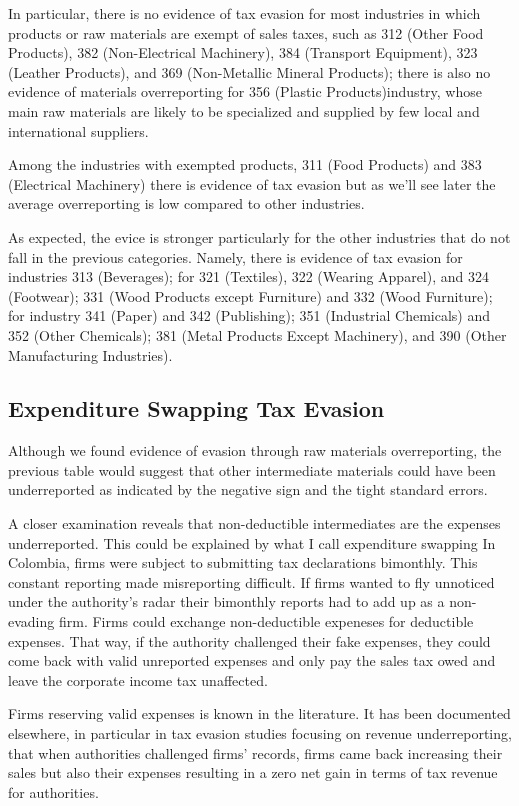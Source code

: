 \documentclass[
  12pt]{article}
\theoremstyle{definition}
\theoremstyle{remark}
\begin{document}
In particular, there is no evidence of tax evasion for most industries
in which products or raw materials are exempt of sales taxes, such as
312 (Other Food Products), 382 (Non-Electrical Machinery), 384
(Transport Equipment), 323 (Leather Products), and 369 (Non-Metallic
Mineral Products); there is also no evidence of materials overreporting
for 356 (Plastic Products)industry, whose main raw materials are likely
to be specialized and supplied by few local and international suppliers.

Among the industries with exempted products, 311 (Food Products) and 383
(Electrical Machinery) there is evidence of tax evasion but as we'll see
later the average overreporting is low compared to other industries.

As expected, the evice is stronger particularly for the other industries
that do not fall in the previous categories. Namely, there is evidence
of tax evasion for industries 313 (Beverages); for 321 (Textiles), 322
(Wearing Apparel), and 324 (Footwear); 331 (Wood Products except
Furniture) and 332 (Wood Furniture); for industry 341 (Paper) and 342
(Publishing); 351 (Industrial Chemicals) and 352 (Other Chemicals); 381
(Metal Products Except Machinery), and 390 (Other Manufacturing
Industries).

\subsection{Expenditure Swapping Tax
Evasion}\label{expenditure-swapping-tax-evasion}

Although we found evidence of evasion through raw materials
overreporting, the previous table would suggest that other intermediate
materials could have been underreported as indicated by the negative
sign and the tight standard errors.

A closer examination reveals that non-deductible intermediates are the
expenses underreported. This could be explained by what I call
expenditure swapping In Colombia, firms were subject to submitting tax
declarations bimonthly. This constant reporting made misreporting
difficult. If firms wanted to fly unnoticed under the authority's radar
their bimonthly reports had to add up as a non-evading firm. Firms could
exchange non-deductible expeneses for deductible expenses. That way, if
the authority challenged their fake expenses, they could come back with
valid unreported expenses and only pay the sales tax owed and leave the
corporate income tax unaffected.

Firms reserving valid expenses is known in the literature. It has been
documented elsewhere, in particular in tax evasion studies focusing on
revenue underreporting, that when authorities challenged firms' records,
firms came back increasing their sales but also their expenses resulting
in a zero net gain in terms of tax revenue for authorities.
\end{document}
